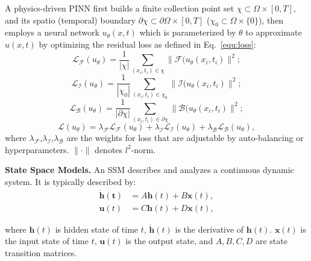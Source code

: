 A physics-driven PINN first builds a finite collection point set $\chi \subset \Omega\times[0,T]$, and its spatio (temporal) boundary $\partial\chi \subset \partial\Omega\times[0,T]$ ($\chi_0 \subset \Omega\times\{0\}$), then employs a neural network $u_\theta(x,t)$ which is parameterized by $\theta$ to approximate $u(x,t)$ by optimizing the residual loss as defined in Eq.~\ref{equ:loss}:
\vspace{-2mm}
\begin{equation}
    \mathcal L_{\mathcal F}(u_\theta)= \frac{1}{|\chi|}\sum_{(x_i,t_i)\in \chi}\|\mathcal F(u_\theta(x_i,t_i)\|^2;
    \label{equ:lossequ}
\end{equation}
\begin{equation}
    \mathcal L_{\mathcal I}(u_\theta)= \frac{1}{|\chi_0|}\sum_{(x_i,t_i)\in \chi_0}\|\mathcal I(u_\theta(x_i,t_i)\|^2;
    \label{equ:lossinit}
\end{equation}
\begin{equation}
    \mathcal L_{\mathcal B}(u_\theta)= \frac{1}{|\partial\chi|}\sum_{(x_i,t_i)\in \partial\chi}\|\mathcal B(u_\theta(x_i,t_i)\|^2;
    \label{equ:lossbound}
\end{equation}
\begin{equation}
    \mathcal L(u_\theta)=\lambda_{\mathcal F}\mathcal L_{\mathcal F}(u_\theta)+\lambda_{\mathcal I}\mathcal L_{\mathcal I}(u_\theta)+\lambda_{\mathcal B}\mathcal L_{\mathcal B}(u_\theta),
    \label{equ:loss}
\end{equation}
where $\lambda_\mathcal F$,$\lambda_\mathcal I$,$\lambda_\mathcal B$ are the weights for loss that are adjustable by auto-balancing or hyperparameters. $\|\cdot\|$ denotes $l^2$-norm.


\textbf{State Space Models.} An SSM describes and analyzes a continuous dynamic system. It is typically described by:
\begin{align}    \label{equ:hiddenssm}
   \mathbf {\dot h(t)} &= A\mathbf h(t) + B\mathbf x(t),\\
     \mathbf u(t) &= C\mathbf h(t) + D\mathbf x(t),
     \label{equ:outputssm}
\end{align}

where $\mathbf h(t)$ is hidden state of time $t$, $\mathbf {\dot  h}(t)$ is the derivative of $\mathbf h(t)$. $\mathbf x(t)$ is the input state of time $t$, $\mathbf u(t)$ is the output state, and $A,B,C,D$ are state transition matrices. 
    
